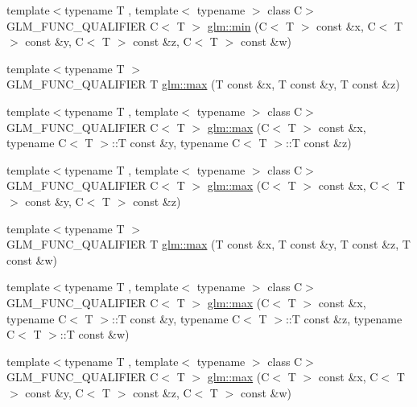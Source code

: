 \begin{DoxyCompactItemize}
{\footnotesize template$<$typename T , template$<$ typename $>$ class C$>$ }\\G\-L\-M\-\_\-\-F\-U\-N\-C\-\_\-\-Q\-U\-A\-L\-I\-F\-I\-E\-R C$<$ T $>$ \hyperlink{group__gtx__extented__min__max_ga7471ea4159eed8dd9ea4ac5d46c2fead}{glm\-::min} (C$<$ T $>$ const \&x, C$<$ T $>$ const \&y, C$<$ T $>$ const \&z, C$<$ T $>$ const \&w)
\item 
{\footnotesize template$<$typename T $>$ }\\G\-L\-M\-\_\-\-F\-U\-N\-C\-\_\-\-Q\-U\-A\-L\-I\-F\-I\-E\-R T \hyperlink{group__gtx__extented__min__max_ga04991ccb9865c4c4e58488cfb209ce69}{glm\-::max} (T const \&x, T const \&y, T const \&z)
\item 
{\footnotesize template$<$typename T , template$<$ typename $>$ class C$>$ }\\G\-L\-M\-\_\-\-F\-U\-N\-C\-\_\-\-Q\-U\-A\-L\-I\-F\-I\-E\-R C$<$ T $>$ \hyperlink{group__gtx__extented__min__max_gae1b7bbe5c91de4924835ea3e14530744}{glm\-::max} (C$<$ T $>$ const \&x, typename C$<$ T $>$\-::T const \&y, typename C$<$ T $>$\-::T const \&z)
\item 
{\footnotesize template$<$typename T , template$<$ typename $>$ class C$>$ }\\G\-L\-M\-\_\-\-F\-U\-N\-C\-\_\-\-Q\-U\-A\-L\-I\-F\-I\-E\-R C$<$ T $>$ \hyperlink{group__gtx__extented__min__max_gaf832e9d4ab4826b2dda2fda25935a3a4}{glm\-::max} (C$<$ T $>$ const \&x, C$<$ T $>$ const \&y, C$<$ T $>$ const \&z)
\item 
{\footnotesize template$<$typename T $>$ }\\G\-L\-M\-\_\-\-F\-U\-N\-C\-\_\-\-Q\-U\-A\-L\-I\-F\-I\-E\-R T \hyperlink{group__gtx__extented__min__max_ga78e04a0cef1c4863fcae1a2130500d87}{glm\-::max} (T const \&x, T const \&y, T const \&z, T const \&w)
\item 
{\footnotesize template$<$typename T , template$<$ typename $>$ class C$>$ }\\G\-L\-M\-\_\-\-F\-U\-N\-C\-\_\-\-Q\-U\-A\-L\-I\-F\-I\-E\-R C$<$ T $>$ \hyperlink{group__gtx__extented__min__max_ga7cca8b53cfda402040494cdf40fbdf4a}{glm\-::max} (C$<$ T $>$ const \&x, typename C$<$ T $>$\-::T const \&y, typename C$<$ T $>$\-::T const \&z, typename C$<$ T $>$\-::T const \&w)
\item 
{\footnotesize template$<$typename T , template$<$ typename $>$ class C$>$ }\\G\-L\-M\-\_\-\-F\-U\-N\-C\-\_\-\-Q\-U\-A\-L\-I\-F\-I\-E\-R C$<$ T $>$ \hyperlink{group__gtx__extented__min__max_gaacffbc466c2d08c140b181e7fd8a4858}{glm\-::max} (C$<$ T $>$ const \&x, C$<$ T $>$ const \&y, C$<$ T $>$ const \&z, C$<$ T $>$ const \&w)
\end{DoxyCompactItemize}


